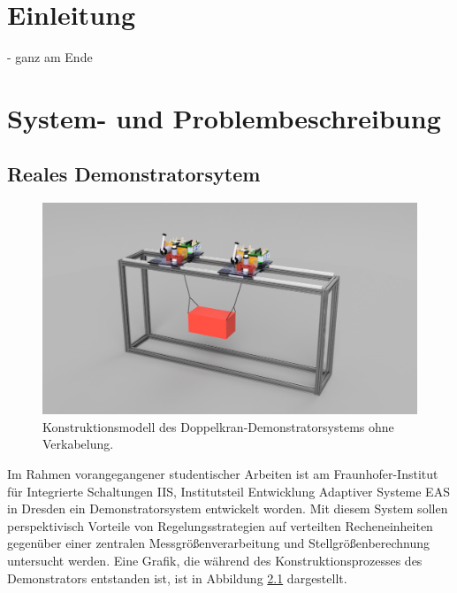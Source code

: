 \pagestyle{scrheadings}

\chapter{Einleitung}
- ganz am Ende

\chapter{System- und Problembeschreibung}

\section{Reales Demonstratorsytem}

\begin{figure}[ht]
	\begin{center}
		\includegraphics[scale=0.5]{Pictures/Veritas_demo_CAD.png}
	\end{center}
	\caption[Konstruktionsmodell des Doppelkransystems]
	{Konstruktionsmodell des Doppelkran-Demonstratorsystems ohne Verkabelung.}
	\label{fig:demonstrator_CAD}
\end{figure}

Im Rahmen vorangegangener studentischer Arbeiten ist am Fraunhofer-Institut für Integrierte Schaltungen IIS, Institutsteil Entwicklung Adaptiver Systeme EAS \cite{fraunhoferIISEAS} in Dresden ein Demonstratorsystem entwickelt worden. Mit diesem System sollen perspektivisch Vorteile von Regelungsstrategien auf verteilten Recheneinheiten gegenüber einer zentralen Messgrößenverarbeitung und Stellgrößenberechnung untersucht werden. Eine Grafik, die während des Konstruktionsprozesses des Demonstrators entstanden ist, ist in Abbildung \ref{fig:demonstrator_CAD} dargestellt.


